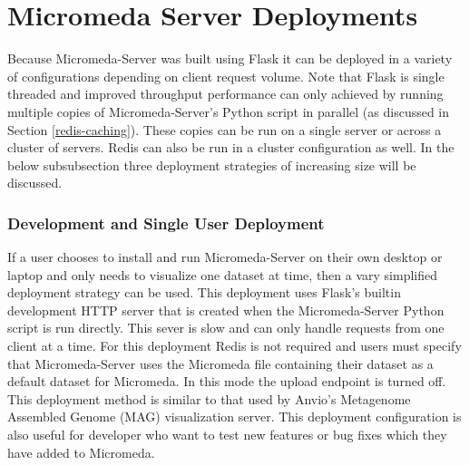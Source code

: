 \section{Micromeda Server Deployments}

Because Micromeda-Server was built using Flask it can be deployed in a variety of configurations depending on client request volume. Note that Flask is single threaded and improved throughput performance can only achieved by running multiple copies of Micromeda-Server's Python script in parallel (as discussed in Section \ref{redis-caching}). These copies can be run on a single server or across a cluster of servers. Redis can also be run in a cluster configuration as well. In the below subsubsection three deployment strategies of increasing size will be discussed.

\subsubsection{Development and Single User Deployment}

If a user chooses to install and run Micromeda-Server on their own desktop or laptop and only needs to visualize one dataset at time, then a vary simplified deployment strategy can be used. This deployment uses Flask's builtin development HTTP server that is created when the Micromeda-Server Python script is run directly. This sever is slow and can only handle requests from one client at a time. For this deployment Redis is not required and users must specify that Micromeda-Server uses the Micromeda file containing their dataset as a default dataset for Micromeda. In this mode the upload endpoint is turned off. This deployment method is similar to that used by Anvio's Metagenome Assembled Genome (MAG) visualization server. This deployment configuration is also useful for developer who want to test new features or bug fixes which they have added to Micromeda.

